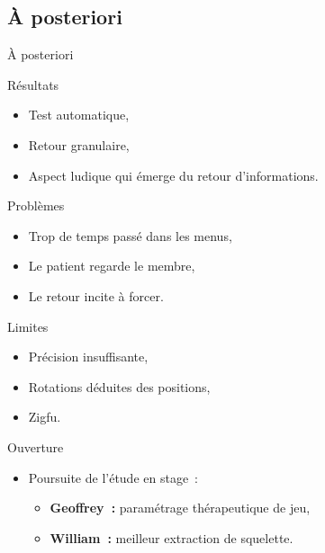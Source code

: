 \subsection{À posteriori}
\begin{frame}{À posteriori}
{
  \begin{block}{Résultats}
  \begin{itemize}
  \item Test automatique,
  \item Retour granulaire,
  \item Aspect ludique qui émerge du retour d'informations.
  \end{itemize}
  \end{block}
}
{
  \begin{alertblock}{Problèmes}
  \begin{itemize}
  \item Trop de temps passé dans les menus,
  \item Le patient regarde le membre,
  \item Le retour incite à forcer.
  \end{itemize}
  \end{alertblock}
}
{
  \begin{alertblock}{Limites}
  \begin{itemize}
  \item Précision insuffisante,
  \item Rotations déduites des positions,
  \item Zigfu.
  \end{itemize}
  \end{alertblock}
}
{
  \begin{block}{Ouverture}
  \begin{itemize}
  \item Poursuite de l'étude en stage~:
  \begin{itemize}
  \item \textbf{Geoffrey~:} paramétrage thérapeutique de jeu,
  \item \textbf{William~:} meilleur extraction de squelette. 
  \end{itemize}
  \end{itemize}
  \end{block}
}

\end{frame}